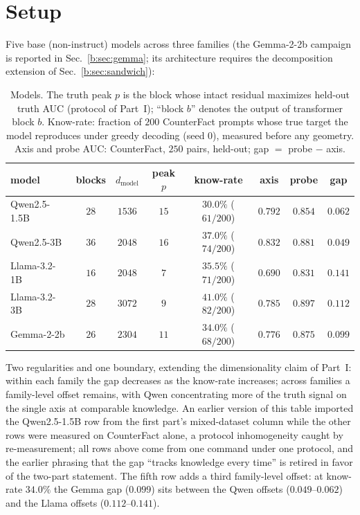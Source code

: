 \documentclass[11pt]{article}
\begin{document}
\section{Setup}
\label{b:sec:setup}

Five base (non-instruct) models across three families (the Gemma-2-2b
campaign is reported in Sec.~\ref{b:sec:gemma}; its architecture requires
the decomposition extension of Sec.~\ref{b:sec:sandwich}):

\begin{table}[H]
\centering
\caption{Models. The truth peak $p$ is the block whose intact residual
maximizes held-out truth AUC (protocol of Part~I); ``block $b$''
denotes the output of transformer block $b$. Know-rate: fraction of $200$
CounterFact prompts whose true target the model reproduces under greedy
decoding (seed $0$), measured before any geometry. Axis and probe AUC:
CounterFact, $250$ pairs, held-out; gap $=$ probe $-$ axis.}
\label{b:tab:models}
\begin{tabular}{lccccccc}
\toprule
model & blocks & $d_{\mathrm{model}}$ & peak $p$ & know-rate & axis & probe & gap \\
\midrule
Qwen2.5-1.5B  & $28$ & $1536$ & $15$ & $30.0\%$ ($61/200$) & $0.792$ & $0.854$ & $0.062$ \\
Qwen2.5-3B    & $36$ & $2048$ & $16$ & $37.0\%$ ($74/200$) & $0.832$ & $0.881$ & $0.049$ \\
Llama-3.2-1B  & $16$ & $2048$ & $7$  & $35.5\%$ ($71/200$) & $0.690$ & $0.831$ & $0.141$ \\
Llama-3.2-3B  & $28$ & $3072$ & $9$  & $41.0\%$ ($82/200$) & $0.785$ & $0.897$ & $0.112$ \\
Gemma-2-2b    & $26$ & $2304$ & $11$ & $34.0\%$ ($68/200$) & $0.776$ & $0.875$ & $0.099$ \\
\bottomrule
\end{tabular}
\end{table}

Two regularities and one boundary, extending the dimensionality claim
of Part~I: within each family the gap decreases as the know-rate
increases; across families a family-level offset remains, with Qwen
concentrating more of the truth signal on the single axis at comparable
knowledge. An earlier version of this table imported the Qwen2.5-1.5B row
from the first part's mixed-dataset column while the other rows were
measured on CounterFact alone, a protocol inhomogeneity caught by
re-measurement; all rows above come from one command under one protocol,
and the earlier phrasing that the gap ``tracks knowledge every time'' is
retired in favor of the two-part statement. The fifth row adds a third
family-level offset: at know-rate $34.0\%$ the Gemma gap ($0.099$) sits
between the Qwen offsets ($0.049$--$0.062$) and the Llama offsets
($0.112$--$0.141$).
\end{document}
